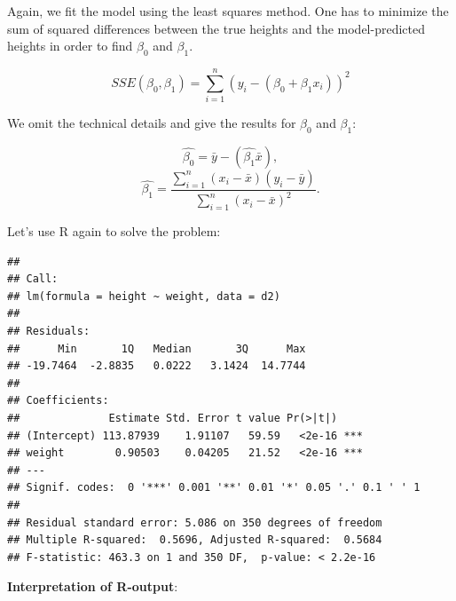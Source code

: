 \documentclass[
]{book}
\newenvironment{Shaded}{\begin{snugshade}}{\end{snugshade}}
\newcommand{\AttributeTok}[1]{\textcolor[rgb]{0.13,0.29,0.53}{#1}}
\newcommand{\DecValTok}[1]{\textcolor[rgb]{0.00,0.00,0.81}{#1}}
\newcommand{\FunctionTok}[1]{\textcolor[rgb]{0.13,0.29,0.53}{\textbf{#1}}}
\newcommand{\NormalTok}[1]{#1}
\newcommand{\OtherTok}[1]{\textcolor[rgb]{0.56,0.35,0.01}{#1}}
\newcommand{\SpecialCharTok}[1]{\textcolor[rgb]{0.81,0.36,0.00}{\textbf{#1}}}
\begin{document}
Again, we fit the model using the least squares method.
One has to minimize the sum of squared differences between the true heights and
the model-predicted heights in order to find \(\beta_0\) and \(\beta_1\).

\[ SSE(\beta_0, \beta_1) = \sum_{i=1}^n (y_i - (\beta_0 + \beta_1 x_i))^2 \]

We omit the technical details and give the results for \(\beta_0\) and \(\beta_1\):

\[
\hat{\beta_0} = \bar{y} - (\hat{\beta_1} \bar{x}),
\]
\[
\hat{\beta_1} = \frac{\sum_{i=1}^n (x_i - \bar{x})(y_i - \bar{y})}{\sum_{i=1}^n (x_i - \bar{x})^2}.
\]

Let's use R again to solve the problem:

\begin{Shaded}
\end{Shaded}

\begin{verbatim}
## 
## Call:
## lm(formula = height ~ weight, data = d2)
## 
## Residuals:
##      Min       1Q   Median       3Q      Max 
## -19.7464  -2.8835   0.0222   3.1424  14.7744 
## 
## Coefficients:
##              Estimate Std. Error t value Pr(>|t|)    
## (Intercept) 113.87939    1.91107   59.59   <2e-16 ***
## weight        0.90503    0.04205   21.52   <2e-16 ***
## ---
## Signif. codes:  0 '***' 0.001 '**' 0.01 '*' 0.05 '.' 0.1 ' ' 1
## 
## Residual standard error: 5.086 on 350 degrees of freedom
## Multiple R-squared:  0.5696, Adjusted R-squared:  0.5684 
## F-statistic: 463.3 on 1 and 350 DF,  p-value: < 2.2e-16
\end{verbatim}

\textbf{Interpretation of R-output}:
\end{document}

